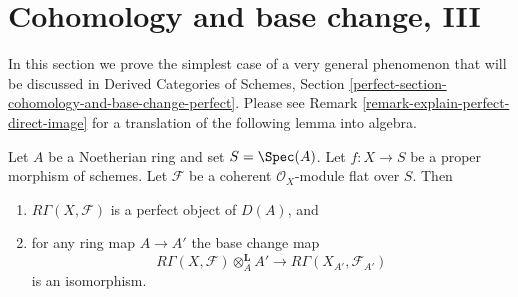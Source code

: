 \section{Cohomology and base change, III}
\label{section-cohomology-and-base-change-perfect}

\noindent
In this section we prove the simplest case of a very general phenomenon
that will be discussed in
Derived Categories of Schemes, Section
\ref{perfect-section-cohomology-and-base-change-perfect}.
Please see Remark \ref{remark-explain-perfect-direct-image} for a translation
of the following lemma into algebra.

\begin{lemma}
\label{lemma-perfect-direct-image}
Let $A$ be a Noetherian ring and set $S = \Spec(A)$. Let $f : X \to S$ be a
proper morphism of schemes. Let $\mathcal{F}$ be a coherent
$\mathcal{O}_X$-module flat over $S$. Then
\begin{enumerate}
\item $R\Gamma(X, \mathcal{F})$ is a perfect object of $D(A)$, and
\item for any ring map $A \to A'$ the base change map
$$
R\Gamma(X, \mathcal{F}) \otimes_A^{\mathbf{L}} A'
\longrightarrow
R\Gamma(X_{A'}, \mathcal{F}_{A'})
$$
is an isomorphism.
\end{enumerate}
\end{lemma}

